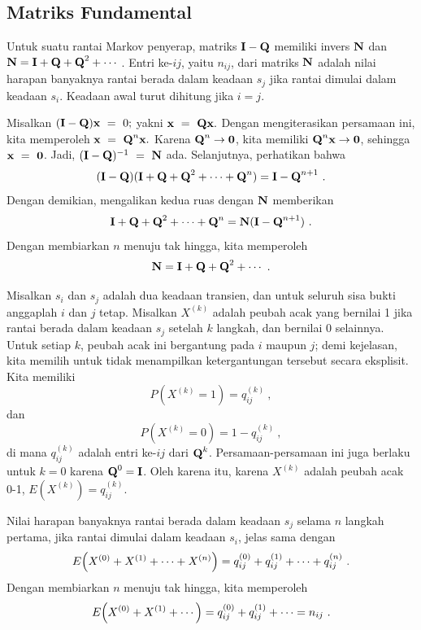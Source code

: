 \subsection*{Matriks Fundamental}
\begin{theorem}\label{thm 11.2.2}
Untuk suatu rantai Markov penyerap, matriks ${\mbox{\bf I}\/} - {\mbox{\bf Q}\/}$ memiliki invers
${\mbox{\bf N}\/}$ dan
$\mat{N} =\mat{I} + \mat{Q} + \mat{Q}^{2} + \cdots\ $. Entri ke-$ij$, yaitu
$n_{ij}$, dari matriks ${\mbox{\bf N}\/}$ adalah nilai harapan banyaknya rantai berada
dalam keadaan $s_j$ jika rantai dimulai dalam keadaan $s_i$. Keadaan awal turut
dihitung jika $i = j$.

\proof  
Misalkan $({\mbox{\bf I}\/} - {\mbox{\bf Q}\/}){\mbox{\bf x}\/}~=~0;$ yakni
${\mbox{\bf x}\/}~=~{\mbox{\bf Q}\/}{\mbox{\bf x}\/}.$ Dengan mengiterasikan persamaan ini, kita memperoleh
${\mbox{\bf x}\/}~=~{\mbox{\bf Q}\/}^{n}{\mbox{\bf x}\/}.$ Karena ${\mbox{\bf Q}\/}^{n} \rightarrow {\mbox{\bf0}\/}$, kita
memiliki ${\mbox{\bf Q}\/}^n{\mbox{\bf x}\/} \rightarrow {\mbox{\bf0}\/}$, sehingga
${\mbox{\bf x}\/}~=~{\mbox{\bf0}\/}$. Jadi, $({\mbox{\bf I}\/} - {\mbox{\bf Q}\/})^{-1}~=~{\mbox{\bf N}\/}$ ada. Selanjutnya,
perhatikan bahwa
$$
({\mbox{\bf I}\/} - {\mbox{\bf Q}\/}) ({\mbox{\bf I}\/} + {\mbox{\bf Q}\/} + {\mbox{\bf Q}\/}^2 + \cdots + {\mbox{\bf Q}\/}^n) =
{\mbox{\bf I}\/} -
{\mbox{\bf Q}\/}^{n + 1}\ .
$$
Dengan demikian, mengalikan kedua ruas dengan ${\mbox{\bf N}\/}$ memberikan
$$
{\mbox{\bf I}\/} + {\mbox{\bf Q}\/} + {\mbox{\bf Q}\/}^2 + \cdots + {\mbox{\bf Q}\/}^n = {\mbox{\bf N}\/} ({\mbox{\bf I}\/} -
{\mbox{\bf Q}\/}^{n + 1})\ .
$$
Dengan membiarkan $n$ menuju tak hingga, kita memperoleh
$$
{\mbox{\bf N}\/} = {\mbox{\bf I}\/} + {\mbox{\bf Q}\/} + {\mbox{\bf Q}\/}^2 + \cdots\ .
$$

Misalkan $s_i$ dan $s_j$ adalah dua keadaan transien, dan untuk seluruh sisa
bukti anggaplah $i$ dan $j$ tetap. Misalkan $X^{(k)}$ adalah peubah acak yang
bernilai 1 jika rantai berada dalam keadaan $s_j$ setelah $k$ langkah, dan
bernilai 0 selainnya. Untuk setiap $k$, peubah acak ini bergantung pada $i$
maupun $j$; demi kejelasan, kita memilih untuk tidak menampilkan ketergantungan
tersebut secara eksplisit. Kita memiliki
$$
P(X^{(k)} = 1) = q_{ij}^{(k)}\ ,
$$
dan
$$
P(X^{(k)} = 0) = 1 - q_{ij}^{(k)}\ ,
$$
di mana $q_{ij}^{(k)}$ adalah entri ke-$ij$ dari ${\mbox{\bf Q}\/}^k$. Persamaan-persamaan
ini juga berlaku untuk $k = 0$ karena ${\mbox{\bf Q}\/}^0 = {\mbox{\bf I}\/}$. Oleh karena itu,
karena $X^{(k)}$ adalah peubah acak 0-1, $E(X^{(k)}) = q_{ij}^{(k)}$.
\par
Nilai harapan banyaknya rantai berada dalam keadaan $s_j$ selama $n$ langkah
pertama, jika rantai dimulai dalam keadaan $s_i$, jelas sama dengan
$$E\Bigl(X^{(0)} + X^{(1)} + \cdots + X^{(n)} \Bigr) = q_{ij}^{(0)} +
q_{ij}^{(1)} +
\cdots + q_{ij}^{(n)}\ .$$
Dengan membiarkan $n$ menuju tak hingga, kita memperoleh
$$
E\Bigl(X^{(0)} + X^{(1)} + \cdots \Bigr) = q_{ij}^{(0)} +
q_{ij}^{(1)} + \cdots  = n_{ij} \ .
$$
\end{theorem}

